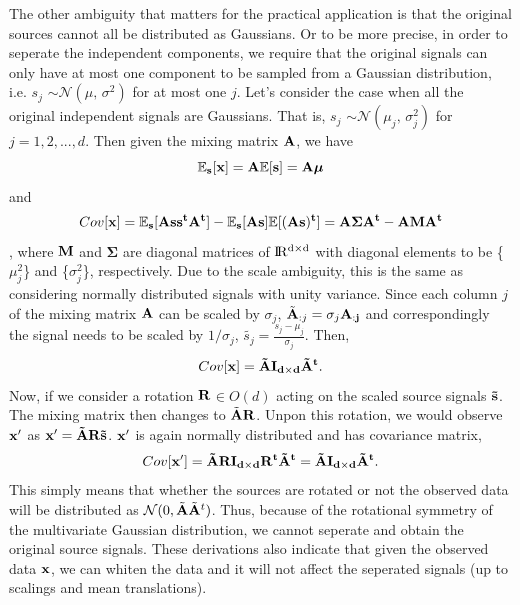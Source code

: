 \documentclass[aps,prl,preprint,superscriptaddress]{revtex4-2}
\begin{document}
The other ambiguity that matters for the practical application is that the original sources cannot all be distributed as Gaussians. Or to be more precise, in order to seperate the independent components, we require that the original signals can only have at most one component to be sampled from a Gaussian distribution, i.e. $s_{j}$ $\sim \mathcal{N}(\mu,\,\sigma^{2})$ for at most one $j$. Let's consider the case when all the original independent signals are Gaussians. That is, $s_{j}$ $\sim \mathcal{N}(\mu_{j},\,\sigma_{j}^{2})$ for $j = 1, 2, ..., d$. Then given the mixing matrix $\bf{A}$, we have 
\begin{equation}
\mathbb{E}_{\bf{s}}[\bf{x}] = \bf{A}\mathbb{E}[\bf{s}] = \bf{A}\bm{\mu}
\end{equation}
and 
\begin{equation}
Cov[\bf{x}] = \mathbb{E}_{\bf{s}}[\bf{As}\bf{s}^t\bf{A}^{t}]-\mathbb{E}_{\bf{s}}[\bf{As}]\mathbb{E}[(\bf{As})^{t}] =  \bf{A}\bm{\Sigma}\bf{A}^{t}-\bf{A}\bf{M}\bf{A}^{t}
\end{equation} 
, where $\bf{M}$ and $\bm{\Sigma}$ are diagonal matrices of $\rm I\!R^{d\times d}$ with diagonal elements to be \{$\mu_{j}^{2}$\} and \{$\sigma_{j}^{2}$\}, respectively. Due to the scale ambiguity, this is the same as considering normally distributed signals with unity variance. Since each column $j$ of the mixing matrix $\bf{A}$ can be scaled by $\sigma_{j}$, $\tilde{\bf{A}}_{:j} = \sigma_{j}\bf{A}_{:j}$ and correspondingly the signal needs to be scaled by $1/\sigma_{j}$, $\tilde{s_{j}} = \frac{s_{j}-\mu_{j}}{\sigma_{j}}$. Then, 
\begin{equation}
Cov[\bf{x}] = \tilde{\bf{A}}\bf{I}_{d\times d}\tilde{\bf{A}}^{t}.
\end{equation}
Now, if we consider a rotation $\bf{R} $$\in O(d)$ acting on the scaled source signals $\bf{\tilde{s}}$. The mixing matrix then changes to $\tilde{\bf{A}}\bf{R}$. Unpon this rotation, we would observe $\bf{x'}$ as $\bf{x'} = \tilde{\bf{A}}\bf{R}\tilde{\bf{s}}$. $\bf{x'}$ is again normally distributed and has covariance matrix,
\begin{equation}
Cov[\bf{x'}] = \tilde{\bf{A}}\bf{R}\bf{I}_{d\times d}\bf{R}^{t}\tilde{\bf{A}}^{t} = \tilde{\bf{A}}\bf{I}_{d\times d}\tilde{\bf{A}}^{t}. 
\end{equation} This simply means that whether the sources are rotated or not the observed data will be distributed as $\mathcal{N}(0, \tilde{\bf{A}}\tilde{\bf{A}}^{t})$. Thus, because of the rotational symmetry of the multivariate Gaussian distribution, we cannot seperate and obtain the original source signals. These derivations also indicate that given the observed data $\bf{x}$, we can whiten the data and it will not affect the seperated signals (up to scalings and mean translations).   
\end{document}
